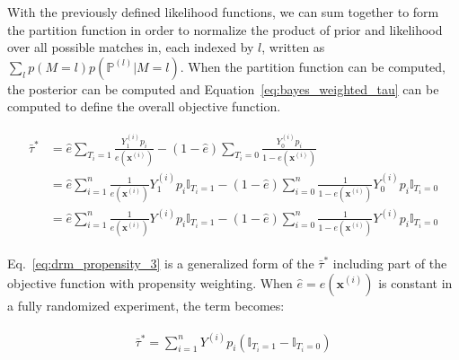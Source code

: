 \documentclass{article}
\begin{document}
With the previously defined likelihood functions, we can sum together to form the partition function in order to normalize the product of prior and likelihood over all possible matches in, each indexed by $l$, written as $\sum_l p(M=l)p(\mathbb{P}^{(l)} | M = l)$. When the partition function can be computed, the posterior can be computed and Equation~\ref{eq:bayes_weighted_tau} can be computed to define the overall objective function. 

\vspace{-0.2cm} 
\begin{align} 
\label{eq:drm_propensity_3} 
\begin{split} 
\bar{\tau}^{*} &= \hat{e} \sum_{T_i =1} \frac{Y^{(i)}_1 p_{i}}{e(\mathbf{x}^{(i)})} - (1-\hat{e}) \sum_{T_i = 0} \frac{Y^{(i)}_0 p_i}{1-e(\mathbf{x}^{(i)})} \\ 
& = \hat{e} \sum_{i=1}^n \frac{1}{e(\mathbf{x}^{(i)})} Y^{(i)}_1 p_{i} \mathbb{I}_{T_i=1} - (1-\hat{e}) \sum_{i = 0}^n \frac{1}{1-e(\mathbf{x}^{(i)})} Y^{(i)}_0 p_i \mathbb{I}_{T_i=0} \\ 
& = \hat{e} \sum_{i=1}^n \frac{1}{e(\mathbf{x}^{(i)})} Y^{(i)} p_{i} \mathbb{I}_{T_i=1} - (1-\hat{e}) \sum_{i = 0}^n \frac{1}{1-e(\mathbf{x}^{(i)})} Y^{(i)} p_i \mathbb{I}_{T_i=0}
\end{split} 
\end{align} 

Eq.~\ref{eq:drm_propensity_3} is a generalized form of the $\bar{\tau}^{*}$ including part of the objective function with propensity weighting. When $\hat{e} = e(\mathbf{x}^{(i)})$ is constant in a fully randomized experiment, the term becomes: %

\vspace{-0.1cm} 
\begin{align} 
\label{eq:drm_propensity_4} 
\begin{split} 
  \bar\tau^{*}=\sum_{i=1}^n Y^{(i)}p_i(\mathbb{I}_{T_i=1} - \mathbb{I}_{T_i=0}) 
\end{split} 
\end{align} 
\vspace{-0.1cm} 
\end{document}
